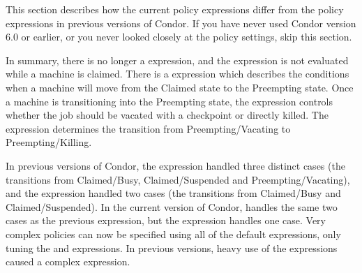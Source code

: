 This section describes how the current policy expressions
differ from the policy expressions in previous versions of Condor.
If you have never used Condor version 6.0 or earlier, or you never looked
closely at the policy settings, skip this section.

In summary, there is no longer a  expression, and the
 expression is not evaluated while a machine is claimed. 
There is a  expression which describes the
conditions when a machine will move from the Claimed state to the
Preempting state.
Once a machine is transitioning into the Preempting state, the
 expression controls whether the job should
be vacated with a checkpoint or directly killed.
The  expression determines the transition from
Preempting/Vacating to Preempting/Killing.  

In previous versions of Condor,
the  expression handled three distinct cases
(the transitions from Claimed/Busy, Claimed/Suspended and
Preempting/Vacating), and the  expression handled
two cases (the transitions from Claimed/Busy and Claimed/Suspended).
In the current version of Condor,  handles the
same two cases as the previous  expression,
but the  expression handles one case.
Very complex policies can now be specified using all of
the default expressions, only tuning the  and
 expressions.
In previous versions, heavy use of the 
expressions caused a complex  expression.
